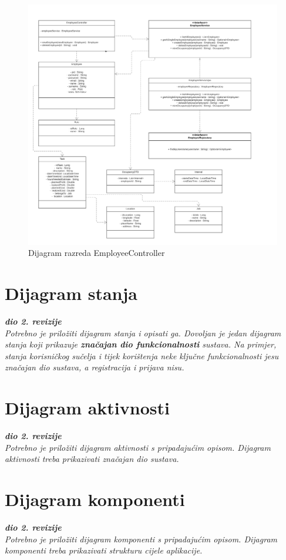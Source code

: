 			
			\eject
			\begin{figure}[H]
					\centering
					\includegraphics[width=\textwidth]{slike/Dijagram razreda - EmployeeController.jpg}
					\caption{Dijagram razreda EmployeeController}
				\end{figure}
			
			
			\eject
		
		\section{Dijagram stanja}
			
			
			\textbf{\textit{dio 2. revizije}}\\
			
			\textit{Potrebno je priložiti dijagram stanja i opisati ga. Dovoljan je jedan dijagram stanja koji prikazuje \textbf{značajan dio funkcionalnosti} sustava. Na primjer, stanja korisničkog sučelja i tijek korištenja neke ključne funkcionalnosti jesu značajan dio sustava, a registracija i prijava nisu. }
			
			
			\eject 
		
		\section{Dijagram aktivnosti}
			
			\textbf{\textit{dio 2. revizije}}\\
			
			 \textit{Potrebno je priložiti dijagram aktivnosti s pripadajućim opisom. Dijagram aktivnosti treba prikazivati značajan dio sustava.}
			
			\eject
		\section{Dijagram komponenti}
		
			\textbf{\textit{dio 2. revizije}}\\
		
			 \textit{Potrebno je priložiti dijagram komponenti s pripadajućim opisom. Dijagram komponenti treba prikazivati strukturu cijele aplikacije.}